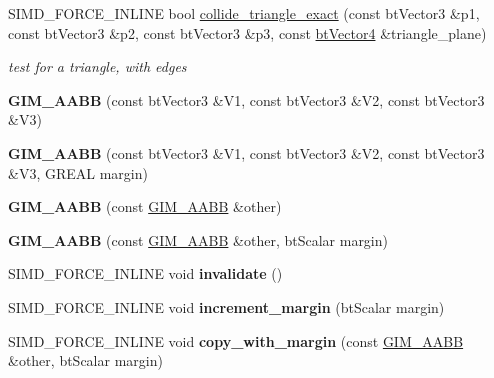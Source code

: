 \begin{DoxyCompactItemize}
S\+I\+M\+D\+\_\+\+F\+O\+R\+C\+E\+\_\+\+I\+N\+L\+I\+NE bool \hyperlink{classGIM__AABB_a4a1ffa196d3981313fccf9e01aa383f9}{collide\+\_\+triangle\+\_\+exact} (const bt\+Vector3 \&p1, const bt\+Vector3 \&p2, const bt\+Vector3 \&p3, const \hyperlink{classbtVector4}{bt\+Vector4} \&triangle\+\_\+plane)
\begin{DoxyCompactList}\small\item\em test for a triangle, with edges \end{DoxyCompactList}\item 
\mbox{\label{classGIM__AABB_a847be701fed53b0d63ec602bce7652b1}} 
{\bfseries G\+I\+M\+\_\+\+A\+A\+BB} (const bt\+Vector3 \&V1, const bt\+Vector3 \&V2, const bt\+Vector3 \&V3)
\item 
\mbox{\label{classGIM__AABB_a371702e73b914b087cb2d489b9c54746}} 
{\bfseries G\+I\+M\+\_\+\+A\+A\+BB} (const bt\+Vector3 \&V1, const bt\+Vector3 \&V2, const bt\+Vector3 \&V3, G\+R\+E\+AL margin)
\item 
\mbox{\label{classGIM__AABB_ab28dc9e3419e00ba699ad8bea92d1cd8}} 
{\bfseries G\+I\+M\+\_\+\+A\+A\+BB} (const \hyperlink{classGIM__AABB}{G\+I\+M\+\_\+\+A\+A\+BB} \&other)
\item 
\mbox{\label{classGIM__AABB_aa938433d929ff7d8d462d6288f2b6964}} 
{\bfseries G\+I\+M\+\_\+\+A\+A\+BB} (const \hyperlink{classGIM__AABB}{G\+I\+M\+\_\+\+A\+A\+BB} \&other, bt\+Scalar margin)
\item 
\mbox{\label{classGIM__AABB_ac22819a9a73fab28f38d365c580e13b9}} 
S\+I\+M\+D\+\_\+\+F\+O\+R\+C\+E\+\_\+\+I\+N\+L\+I\+NE void {\bfseries invalidate} ()
\item 
\mbox{\label{classGIM__AABB_a803c42d8da1d2bdb73bc5338ae155bc6}} 
S\+I\+M\+D\+\_\+\+F\+O\+R\+C\+E\+\_\+\+I\+N\+L\+I\+NE void {\bfseries increment\+\_\+margin} (bt\+Scalar margin)
\item 
\mbox{\label{classGIM__AABB_a216e7f2c10a5cf26db9f2da43cfc91d6}} 
S\+I\+M\+D\+\_\+\+F\+O\+R\+C\+E\+\_\+\+I\+N\+L\+I\+NE void {\bfseries copy\+\_\+with\+\_\+margin} (const \hyperlink{classGIM__AABB}{G\+I\+M\+\_\+\+A\+A\+BB} \&other, bt\+Scalar margin)
\item 

\end{DoxyCompactItemize}
